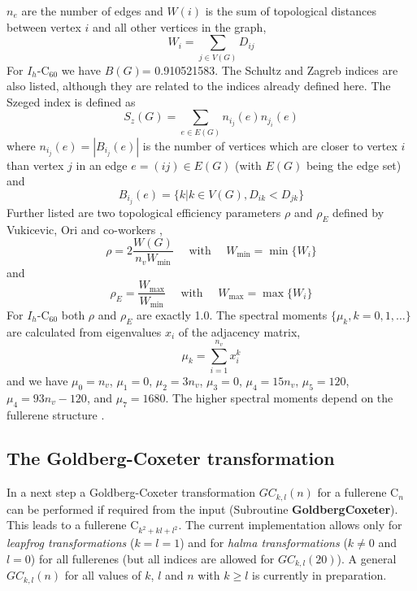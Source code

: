 \documentclass[article,a4paper,twoside]{memoir}
\newcommand{\C}[1]{\ensuremath{\mathrm{C}_{#1}}}
\newcommand{\funname}[1]{{\color{blue}\textbf{#1}}}
\begin{document}
$n_e$ are the number of edges and $W(i)$ is the sum of topological distances between vertex $i$ and all other vertices in the graph,
\begin{equation}
  \label{sum}
  W_i=\sum_{j \in V(G)} D_{ij}
\end{equation}
For $I_h$-\C{60} we have $B(G)$= 0.910521583. The Schultz and Zagreb indices are also listed, although they are related to
the indices already defined here. The Szeged index is defined as\cite{Heydari}
\begin{equation}
  \label{Szeged}
  S_z(G)=\sum_{e \in E(G)} n_{i_j}(e)n_{j_i}(e)
\end{equation}
where $n_{i_j}(e) = |B_{i_j}(e)|$ is the number of vertices which are closer to vertex $i$ than vertex $j$ in an edge $e=(ij) \in E(G)$ (with
$E(G)$ being the edge set) and
\begin{equation}
  \label{Szeged1}
  B_{i_j}(e)= \{ k | k \in V(G), D_{ik} < D_{jk} \}
\end{equation}
Further listed are two topological efficiency parameters $\rho$ and $\rho_E$ defined by Vukicevic, Ori and co-workers \cite{Vukicevic,Ori},
\begin{equation}
  \label{rho}
  \rho=2\frac{W(G)}{n_v W_{\mathrm{min}}} \quad \text{ with } \quad W_{\mathrm{min}}= \min \{ W_i \}
\end{equation}
and
\begin{equation}
  \label{rhoE}
  \rho_E=\frac{W_{\mathrm{max}}}{W_{\mathrm{min}}} \quad \text{ with } \quad W_{\mathrm{max}}= \max \{ W_i \}
\end{equation}
For $I_h$-\C{60} both $\rho$ and $\rho_E$ are exactly 1.0. The spectral moments $\{ \mu_k, k=0,1,\dots \} $ are calculated from eigenvalues $x_i$ of the adjacency matrix,
\begin{equation}
  \label{specmom}
  \mu_k=\sum_{i=1}^{n_v} x_i^k
\end{equation}
and we have $\mu_0 = n_v$, $\mu_1 = 0$, $\mu_2 = 3n_v$, $\mu_3 = 0$, $\mu_4 = 15n_v$, $\mu_5 = 120$, $\mu_4 = 93n_v - 120$, and $\mu_7 = 1680$.
The higher spectral moments depend on the fullerene structure \cite{Fowler93}.

\subsection{The Goldberg-Coxeter transformation}

In a next step a Goldberg-Coxeter transformation $GC_{k,l}(n)$ for a fullerene \C{n} can be performed if required from the input
(Subroutine \funname{GoldbergCoxeter}). This leads to a fullerene C$_{k^2+kl+l^2}$. The current implementation allows only for
\textit{leapfrog transformations} ($k=l=1$) and for \textit{halma transformations} ($k \neq 0$ and $l=0$) for all fullerenes
(but all indices are allowed for $GC_{k,l}(20)$). A general $GC_{k,l}(n)$ for all values of $k$, $l$ and $n$ with $k \geq l$ 
is currently in preparation. 
\end{document}
